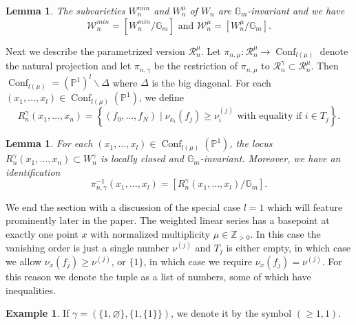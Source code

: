 \documentclass[a4paper,12pt]{amsart}
\newtheorem{lem}[thm]{Lemma}
\theoremstyle{definition}
\newtheorem{exmp}[thm]{Example}
\newcommand{\bG}{\mathbb{G}}
\newcommand{\bP}{\mathbb{P}}
\newcommand{\cW}{\mathcal{W}}
\newcommand{\cR}{\mathcal{R}}
\DeclareMathOperator{\Conf}{Conf}
\newcommand{\Z}{\mathbb{Z}}
\renewcommand{\setminus}{\smallsetminus}
\begin{document}
	\begin{lem} The subvarieties $W_n^{min}$ and $W_n^{\mu}$ of $W_n$ are $\bG_m$-invariant and we have 
		$$
		\cW^{min}_n = \left[W_n^{min}/\bG_m\right] \text{ and } \cW_n^{\mu} = \left[W_n^\mu/\bG_m\right].
		$$
	\end{lem}
	
	Next we describe the parametrized version $\cR_n^{\mu}$. Let $\pi_{n,\mu} : \cR^\mu_n \to \Conf_{l(\mu)}$ denote the natural projection and let $\pi_{n,\gamma}$ be the restriction of $\pi_{n,\mu}$ to $\cR^\gamma_n \subset \cR^\mu_n$. Then $\Conf_{l(\mu)} = (\mathbb{P}^1)^l \setminus \Delta$ where $\Delta$ is the big diagonal. For each $(x_1, \ldots, x_l) \in \Conf_{l(\mu)}(\bP^1)$, we define
	$$
	R^{\gamma}_n(x_1, \ldots, x_n) = \left\{(f_0, \ldots, f_N) \mid \nu_{x_i}(f_j) \geq \nu_i^{(j)} \text{ with equality if } i \in T_j\right\}.
	$$
	
	\begin{lem}\label{l:helper-lemma} For each $(x_1, \ldots, x_l) \in \Conf_{l(\mu)}(\bP^1)$, the locus $R^\gamma_n(x_1, \ldots, x_n) \subset W_n^\gamma$ is locally closed and $\bG_m$-invariant. Moreover, we have an identification
		$$
		\pi_{n,\gamma}^{-1}(x_1, \ldots, x_l) = \left[R^\gamma_n(x_1, \ldots, x_l)/\bG_m\right]. 
		$$
	\end{lem}
	
	We end the section with a discussion of the special case $l = 1$ which will feature prominently later in the paper. The weighted linear series has a basepoint at exactly one point $x$ with normalized multiplicity $\mu \in \Z_{>0}$. In this case the vanishing order is just a single number $\nu^{(j)}$ and $T_j$ is either empty, in which case we allow $\nu_x(f_j) \geq \nu^{(j)}$, or $\{1\}$, in which case we require $\nu_x(f_j) = \nu^{(j)}$. For this reason we denote the tuple as a list of numbers, some of which have inequalities. 
	
	\begin{exmp} If $\gamma = ( \{1,\varnothing\}, \{1,\{1\}\} )$, we denote it by the symbol $(\geq 1, 1)$. \end{exmp}
	
	
	
\end{document}
